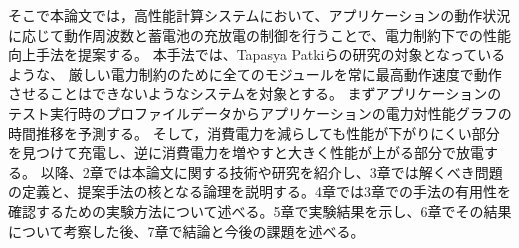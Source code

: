 そこで本論文では，高性能計算システムにおいて、アプリケーションの動作状況に応じて動作周波数と蓄電池の充放電の制御を行うことで、電力制約下での性能向上手法を提案する。
本手法では、Tapasya Patkiらの研究\cite{Patki:2013:EHO:2464996.2465009}の対象となっているような、
厳しい電力制約のために全てのモジュールを常に最高動作速度で動作させることはできないようなシステムを対象とする。
まずアプリケーションのテスト実行時のプロファイルデータからアプリケーションの電力対性能グラフの時間推移を予測する。
そして，消費電力を減らしても性能が下がりにくい部分を見つけて充電し、逆に消費電力を増やすと大きく性能が上がる部分で放電する。
以降、2章では本論文に関する技術や研究を紹介し、3章では解くべき問題の定義と、提案手法の核となる論理を説明する。4章では3章での手法の有用性を確認するための実験方法について述べる。5章で実験結果を示し、6章でその結果について考察した後、7章で結論と今後の課題を述べる。







